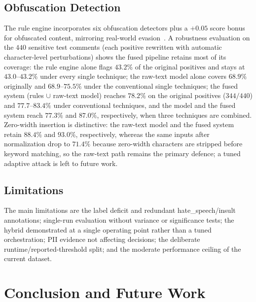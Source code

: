 \documentclass[runningheads]{llncs}
\begin{document}
\subsection{Obfuscation Detection}

The rule engine incorporates six obfuscation detectors plus a $+0.05$ score bonus for obfuscated content, mirroring real-world evasion~\cite{cooper2023,mishra2018,boucher2022}. A robustness evaluation on the $440$ sensitive test comments (each positive rewritten with automatic character-level perturbations) shows the fused pipeline retains most of its coverage: the rule engine alone flags $43.2\%$ of the original positives and stays at $43.0$--$43.2\%$ under every single technique; the raw-text model alone covers $68.9\%$ originally and $68.9$--$75.5\%$ under the conventional single techniques; the fused system (rules $\cup$ raw-text model) reaches $78.2\%$ on the original positives ($344/440$) and $77.7$--$83.4\%$ under conventional techniques, and the model and the fused system reach $77.3\%$ and $87.0\%$, respectively, when three techniques are combined. Zero-width insertion is distinctive: the raw-text model and the fused system retain $88.4\%$ and $93.0\%$, respectively, whereas the same inputs after normalization drop to $71.4\%$ because zero-width characters are stripped before keyword matching, so the raw-text path remains the primary defence; a tuned adaptive attack is left to future work.

\subsection{Limitations}

The main limitations are the label deficit and redundant hate\_speech/insult annotations; single-run evaluation without variance or significance tests; the hybrid demonstrated at a single operating point rather than a tuned orchestration; PII evidence not affecting decisions; the deliberate runtime/reported-threshold split; and the moderate performance ceiling of the current dataset.

\section{Conclusion and Future Work}
\end{document}
